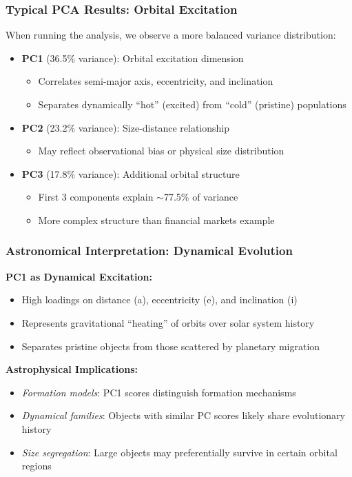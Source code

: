 \documentclass[aspectratio=169]{beamer}
\begin{document}
\begin{frame}
    \frametitle{Typical PCA Results: Orbital Excitation}
    When running the analysis, we observe a more balanced variance distribution:
    \begin{itemize}
        \item \textbf{PC1} (36.5\% variance): Orbital excitation dimension \pause
              \begin{itemize}
                  \item Correlates semi-major axis, eccentricity, and inclination \pause
                  \item Separates dynamically ``hot'' (excited) from ``cold'' (pristine) populations \pause
              \end{itemize}
        \item \textbf{PC2} (23.2\% variance): Size-distance relationship \pause
              \begin{itemize}
                  \item May reflect observational bias or physical size distribution \pause
              \end{itemize}
        \item \textbf{PC3} (17.8\% variance): Additional orbital structure \pause
              \begin{itemize}
                  \item First 3 components explain $\sim$77.5\% of variance \pause
                  \item More complex structure than financial markets example \pause
              \end{itemize}
    \end{itemize}
\end{frame}

\begin{frame}
    \frametitle{Astronomical Interpretation: Dynamical Evolution}
    \textbf{PC1 as Dynamical Excitation:}
    \begin{itemize}
        \item High loadings on distance (a), eccentricity (e), and inclination (i) \pause
        \item Represents gravitational ``heating'' of orbits over solar system history \pause
        \item Separates pristine objects from those scattered by planetary migration \pause
    \end{itemize}
    \vspace{12pt}
    \textbf{Astrophysical Implications:}
    \begin{itemize}
        \item \textit{Formation models}: PC1 scores distinguish formation mechanisms \pause
        \item \textit{Dynamical families}: Objects with similar PC scores likely share evolutionary history \pause
        \item \textit{Size segregation}: Large objects may preferentially survive in certain orbital regions \pause
    \end{itemize}
\end{frame}
\end{document}

